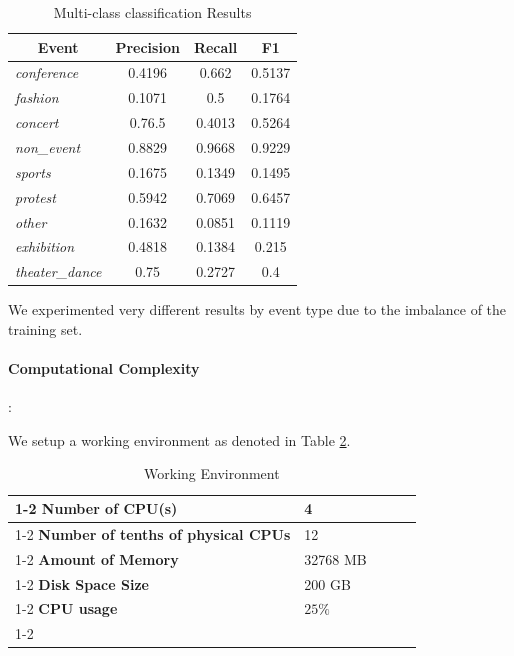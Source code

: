 \documentclass{llncs}
\begin{document}
\begin{table}[htb]
\caption{Multi-class classification Results}
\begin{center}
\begin{tabular}{|l|c|c|c|}
\hline
\multicolumn{1}{|c|}{\textbf{Event}} & \textbf{Precision} & \textbf{Recall} & \textbf{F1} \\ \hline
\textit{conference}                  & 0.4196             & 0.662           & 0.5137      \\ \hline
\textit{fashion}                     & 0.1071             & 0.5             & 0.1764      \\ \hline
\textit{concert}                     & 0.76.5             & 0.4013          & 0.5264      \\ \hline
\textit{non\_event}                  & 0.8829             & 0.9668          & 0.9229      \\ \hline
\textit{sports}                      & 0.1675             & 0.1349          & 0.1495      \\ \hline
\textit{protest}                     & 0.5942             & 0.7069          & 0.6457      \\ \hline
\textit{other}                       & 0.1632             & 0.0851          & 0.1119      \\ \hline
\textit{exhibition}                  & 0.4818             & 0.1384          & 0.215       \\ \hline
\textit{theater\_dance}              & 0.75               & 0.2727          & 0.4             \\ \hline
\end{tabular}

\end{center}
\label{tab3}
\end{table}

We experimented very different results by event type due to the imbalance of the training set.

\paragraph{Computational Complexity}:

We setup a working environment as denoted in Table \ref{tab4}.

\begin{table}[htb]
\caption{Working Environment}
\begin{center}
\begin{tabular}{|l|l|lll}
\cline{1-2}
\textbf{Number of CPU(s)}  & 4          &  &  &  \\ \cline{1-2}
\textbf{Number of tenths of physical CPUs}     & 12          &  &  &  \\ \cline{1-2}
\textbf{Amount of Memory} & 32768 MB          &  &  &  \\ \cline{1-2}
\textbf{Disk Space Size} & 200 GB          &  &  &  \\ \cline{1-2}
\textbf{CPU usage} & $25\%$          &  &  &  \\ \cline{1-2}
\end{tabular}
\end{center}
\label{tab4}
\end{table}
\end{document}

